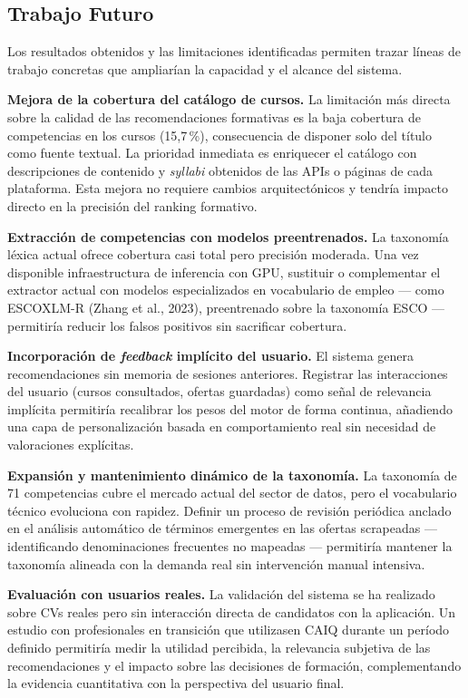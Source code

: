 \subsection{Trabajo Futuro}
\label{subsec:trabajo_futuro}

Los resultados obtenidos y las limitaciones identificadas permiten trazar líneas de
trabajo concretas que ampliarían la capacidad y el alcance del sistema.

\textbf{Mejora de la cobertura del catálogo de cursos.} La limitación más directa sobre
la calidad de las recomendaciones formativas es la baja cobertura de competencias en los
cursos (15,7\,\%), consecuencia de disponer solo del título como fuente textual. La
prioridad inmediata es enriquecer el catálogo con descripciones de contenido y
\textit{syllabi} obtenidos de las APIs o páginas de cada plataforma. Esta mejora no
requiere cambios arquitectónicos y tendría impacto directo en la precisión del ranking
formativo.

\textbf{Extracción de competencias con modelos preentrenados.} La taxonomía léxica
actual ofrece cobertura casi total pero precisión moderada. Una vez disponible
infraestructura de inferencia con GPU, sustituir o complementar el extractor actual con
modelos especializados en vocabulario de empleo --- como ESCOXLM-R (Zhang et al., 2023),
preentrenado sobre la taxonomía ESCO --- permitiría reducir los falsos positivos sin
sacrificar cobertura.

\textbf{Incorporación de \textit{feedback} implícito del usuario.} El sistema genera
recomendaciones sin memoria de sesiones anteriores. Registrar las interacciones del
usuario (cursos consultados, ofertas guardadas) como señal de relevancia implícita
permitiría recalibrar los pesos del motor de forma continua, añadiendo una capa de
personalización basada en comportamiento real sin necesidad de valoraciones explícitas.

\textbf{Expansión y mantenimiento dinámico de la taxonomía.} La taxonomía de 71
competencias cubre el mercado actual del sector de datos, pero el vocabulario técnico
evoluciona con rapidez. Definir un proceso de revisión periódica anclado en el análisis
automático de términos emergentes en las ofertas scrapeadas --- identificando denominaciones
frecuentes no mapeadas --- permitiría mantener la taxonomía alineada con la demanda real
sin intervención manual intensiva.

\textbf{Evaluación con usuarios reales.} La validación del sistema se ha realizado sobre
CVs reales pero sin interacción directa de candidatos con la aplicación. Un estudio con
profesionales en transición que utilizasen CAIQ durante un período definido permitiría
medir la utilidad percibida, la relevancia subjetiva de las recomendaciones y el impacto
sobre las decisiones de formación, complementando la evidencia cuantitativa con la
perspectiva del usuario final.


